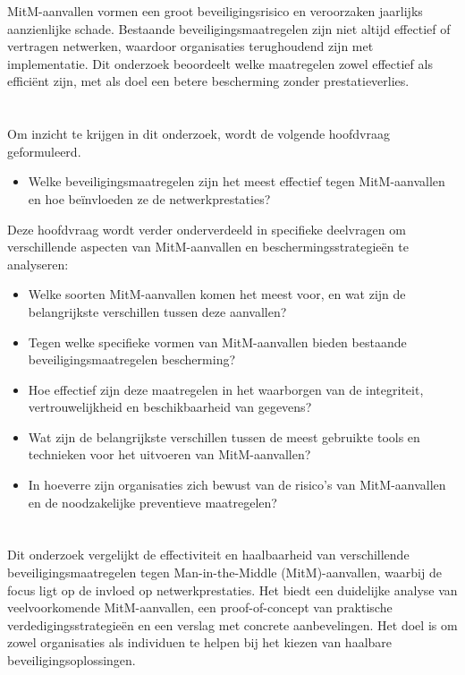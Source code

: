 MitM-aanvallen vormen een groot beveiligingsrisico en veroorzaken jaarlijks aanzienlijke schade. Bestaande beveiligingsmaatregelen zijn niet altijd effectief of vertragen netwerken, waardoor organisaties terughoudend zijn met implementatie. Dit onderzoek beoordeelt welke maatregelen zowel effectief als efficiënt zijn, met als doel een betere bescherming zonder prestatieverlies.

\section{}%
\label{sec:onderzoeksvraag}
Om inzicht te krijgen in dit onderzoek, wordt de volgende hoofdvraag geformuleerd. 
\begin{itemize}

   \item Welke beveiligingsmaatregelen zijn het meest effectief tegen MitM-aanvallen en hoe beïnvloeden ze de netwerkprestaties?
\end{itemize}

Deze hoofdvraag wordt verder onderverdeeld in specifieke deelvragen om verschillende aspecten van MitM-aanvallen en beschermingsstrategieën te analyseren:

\begin{itemize}
    \item Welke soorten MitM-aanvallen komen het meest voor, en wat zijn de belangrijkste verschillen tussen deze aanvallen?
    \item Tegen welke specifieke vormen van MitM-aanvallen bieden bestaande beveiligingsmaatregelen bescherming?
    \item Hoe effectief zijn deze maatregelen in het waarborgen van de integriteit, vertrouwelijkheid en beschikbaarheid van gegevens?
    \item Wat zijn de belangrijkste verschillen tussen de meest gebruikte tools en technieken voor het uitvoeren van MitM-aanvallen?
    \item In hoeverre zijn organisaties zich bewust van de risico’s van MitM-aanvallen en de noodzakelijke preventieve maatregelen?
\end{itemize}
\section{}%
\label{sec:onderzoeksdoelstelling}

Dit onderzoek vergelijkt de effectiviteit en haalbaarheid van verschillende beveiligingsmaatregelen tegen Man-in-the-Middle (MitM)-aanvallen, waarbij de focus ligt op de invloed op netwerkprestaties. Het biedt een duidelijke analyse van veelvoorkomende MitM-aanvallen, een proof-of-concept van praktische verdedigingsstrategieën en een verslag met concrete aanbevelingen. Het doel is om zowel organisaties als individuen te helpen bij het kiezen van haalbare beveiligingsoplossingen.

